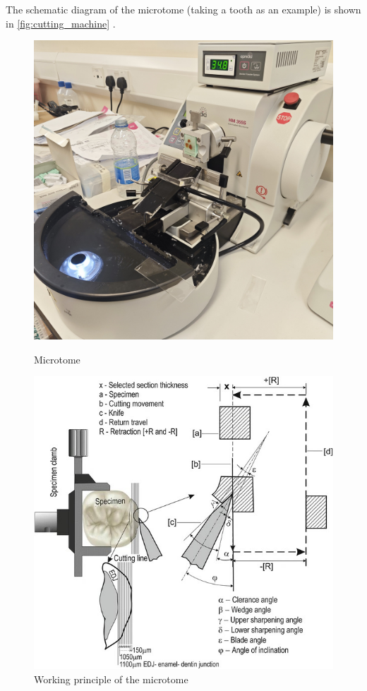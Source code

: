 The schematic diagram of the microtome (taking a tooth as an example) is shown in \autoref{fig:cutting_machine} \cite{4.1}.

\begin{figure}[htbp]
    \centering
    \begin{minipage}{0.48\textwidth}
        \centering
        \includegraphics[width=\textwidth]{./fig/machine.jpg}
        \caption{Microtome}
        \label{fig:machine}
    \end{minipage}
    \begin{minipage}{0.48\textwidth}
        \centering
        \includegraphics[width=\textwidth]{./fig/10266_2018_353_Fig1_HTML.jpg}
        \caption{Working principle of the microtome}
        \label{fig:cutting_machine}
    \end{minipage}
\end{figure}

